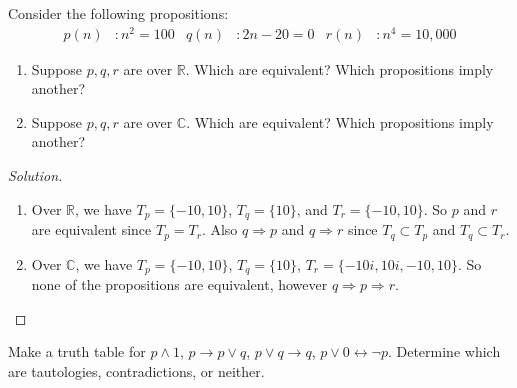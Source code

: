 \documentclass[crop=false,class=book,oneside]{standalone}
\begin{document}
    \begin{problem}
    Consider the following propositions:
    \begin{align*}
        p(n)&:n^{2}=100 & q(n)&:2n-20=0 & r(n)&:n^{4}=10,000
    \end{align*}
    \begin{enumerate}
        \item Suppose $p,q,r$ are over $\mathbb{R}$. Which are equivalent? Which propositions imply another?
        \item Suppose $p,q,r$ are over $\mathbb{C}$. Which are equivalent? Which propositions imply another?
    \end{enumerate}
    \end{problem}
    \begin{proof}[Solution]
    \vspace{-\topsep}
    \
    \begin{enumerate}
        \item Over $\mathbb{R}$, we have $T_{p} = \{-10,10\}$, $T_{q} = \{10\}$, and $T_{r} = \{-10,10\}$. So $p$ and $r$ are equivalent since $T_{p} = T_{r}$. Also $q\Rightarrow p$ and $q\Rightarrow r$ since $T_{q} \subset T_{p}$ and $T_{q}\subset T_{r}$.
        \item Over $\mathbb{C}$, we have $T_{p} = \{-10,10\}$, $T_{q} = \{10\}$, $T_{r} = \{-10i,10i,-10,10\}$. So none of the propositions are equivalent, however $q\Rightarrow p \Rightarrow r$.
    \end{enumerate}
    \end{proof}
    \begin{problem}
    \label{problem:discrete structures_make_a_truth_table_for_p_and_1_and_more}
    Make a truth table for $p\land 1$, $p\rightarrow p\lor q$, $p\lor q \rightarrow q$, $p\lor 0 \leftrightarrow \neg p$. Determine which are tautologies, contradictions, or neither.
    \end{problem}
\end{document}
